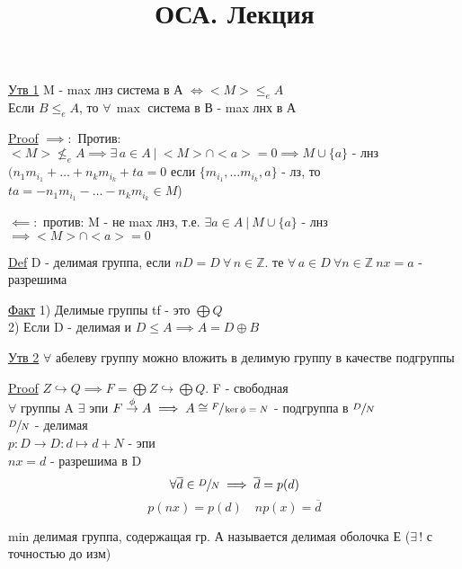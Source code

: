 \documentclass[a4paper]{article}
\begin{document}
\title{ОСА. Лекция}
\maketitle

\begin{tcolorbox}
    \underline{Утв 1} M - max лнз система в А $ \iff <M> \leq_e A $\\
    Если $ B \leq_e A $, то $ \forall \, \max $ система в В - max лнх в А

    \underline{Proof} $ \implies: $ Против: $ <M> \not\leq_e A \implies
    \exists \, a \in A \ | \ <M> \cap <a> = 0 \implies M \cup \{ a \} \text{ - лнз}$\\
    $ (n_1 m_{i_1} + \dots + n_k m_{i_k} + ta = 0 $ если $ 
    \{ m_{i_1}, \dots m_{i_k}, a\} $ - лз, то $ ta = -n_1 m_{i_1} - \dots - n_k
    m_{i_k} \in M $)  

    $ \impliedby: $ против: M - не max лнз, т.е. $ \exists a \in A \ | \ M \cup \{ a\} $ 
    - лнз $ \implies <M> \cap <a> = 0 $ 
\end{tcolorbox}

\begin{tcolorbox}
    \underline{Def} D - делимая группа, если $ nD = D \ \forall \, n \in \mathbb{Z} $.
    те $ \forall \, a \in D \ \forall n \in \mathbb{Z} \ nx = a $ - разрешима
\end{tcolorbox}

\begin{tcolorbox}
    \underline{Факт} 1) Делимые группы tf - это $ \bigoplus Q $ \\
    2) Если D - делимая и $ D \leq A \implies A = D \oplus B $ 
\end{tcolorbox}

\begin{tcolorbox}
    \underline{Утв 2} $ \forall $ абелеву группу можно вложить в делимую группу в 
    качестве подгруппы

    \underline{Proof} $ Z \hookrightarrow Q \implies F = \bigoplus Z \hookrightarrow
    \bigoplus Q$. F - свободная\\
    $ \forall $ группы A $ \exists $ эпи $ F \stackrel{\phi}{\to} A \implies
    A \cong \sfrac{F}{\ker \phi = N}  $  - подгруппа в $ \sfrac{D}{N}  $ \\
    $  \sfrac{D}{N} $ - делимая\\
    $ p: D \to D: d \mapsto d + N $ - эпи\\
    $ nx = d $ - разрешима в D
    \[
        \forall \overline{d} \in \sfrac{D}{N} \implies \overline{d} = p(d)
    \]
    \[
        p(nx) = p(d) \quad np(x) = \overline{d}
    \]

    min делимая группа, содержащая гр. А называется делимая оболочка Е ($ \exists \, ! $ 
    с точностью до изм)
\end{tcolorbox}
\end{document}

